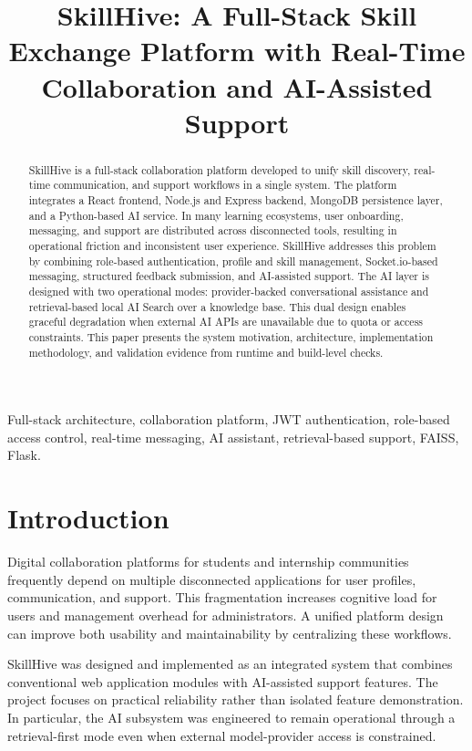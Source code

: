 \documentclass[conference]{IEEEtran}
\title{SkillHive: A Full-Stack Skill Exchange Platform with Real-Time Collaboration and AI-Assisted Support}
\author{\IEEEauthorblockN{Ashish Kushwaha}
\IEEEauthorblockA{Department of Computer Science and Engineering \\
[Institute Name], [City], India \\
Email: [author-email@example.com]}}
\begin{document}
\maketitle

\begin{abstract}
SkillHive is a full-stack collaboration platform developed to unify skill discovery, real-time communication, and support workflows in a single system. The platform integrates a React frontend, Node.js and Express backend, MongoDB persistence layer, and a Python-based AI service. In many learning ecosystems, user onboarding, messaging, and support are distributed across disconnected tools, resulting in operational friction and inconsistent user experience. SkillHive addresses this problem by combining role-based authentication, profile and skill management, Socket.io-based messaging, structured feedback submission, and AI-assisted support. The AI layer is designed with two operational modes: provider-backed conversational assistance and retrieval-based local AI Search over a knowledge base. This dual design enables graceful degradation when external AI APIs are unavailable due to quota or access constraints. This paper presents the system motivation, architecture, implementation methodology, and validation evidence from runtime and build-level checks.
\end{abstract}

\begin{IEEEkeywords}
Full-stack architecture, collaboration platform, JWT authentication, role-based access control, real-time messaging, AI assistant, retrieval-based support, FAISS, Flask.
\end{IEEEkeywords}

\section{Introduction}
Digital collaboration platforms for students and internship communities frequently depend on multiple disconnected applications for user profiles, communication, and support. This fragmentation increases cognitive load for users and management overhead for administrators. A unified platform design can improve both usability and maintainability by centralizing these workflows.

SkillHive was designed and implemented as an integrated system that combines conventional web application modules with AI-assisted support features. The project focuses on practical reliability rather than isolated feature demonstration. In particular, the AI subsystem was engineered to remain operational through a retrieval-first mode even when external model-provider access is constrained.
\end{document}
